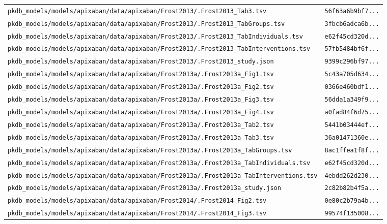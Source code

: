 \documentclass{article}
\begin{document}
\begin{longtable}{ll}
\texttt{pkdb\_models/models/apixaban/data/apixaban/Frost2013/.Frost2013\_Tab3.tsv} & \texttt{56f63a6b9bf7...} \\
\texttt{pkdb\_models/models/apixaban/data/apixaban/Frost2013/.Frost2013\_TabGroups.tsv} & \texttt{3fbcb6adca6b...} \\
\texttt{pkdb\_models/models/apixaban/data/apixaban/Frost2013/.Frost2013\_TabIndividuals.tsv} & \texttt{e62f45cd320d...} \\
\texttt{pkdb\_models/models/apixaban/data/apixaban/Frost2013/.Frost2013\_TabInterventions.tsv} & \texttt{57fb5484bf6f...} \\
\texttt{pkdb\_models/models/apixaban/data/apixaban/Frost2013/.Frost2013\_study.json} & \texttt{9399c296bf97...} \\
\texttt{pkdb\_models/models/apixaban/data/apixaban/Frost2013a/.Frost2013a\_Fig1.tsv} & \texttt{5c43a705d634...} \\
\texttt{pkdb\_models/models/apixaban/data/apixaban/Frost2013a/.Frost2013a\_Fig2.tsv} & \texttt{0366e460bdf1...} \\
\texttt{pkdb\_models/models/apixaban/data/apixaban/Frost2013a/.Frost2013a\_Fig3.tsv} & \texttt{56dda1a349f9...} \\
\texttt{pkdb\_models/models/apixaban/data/apixaban/Frost2013a/.Frost2013a\_Fig4.tsv} & \texttt{a0fad84f6d75...} \\
\texttt{pkdb\_models/models/apixaban/data/apixaban/Frost2013a/.Frost2013a\_Tab2.tsv} & \texttt{5441b03444ef...} \\
\texttt{pkdb\_models/models/apixaban/data/apixaban/Frost2013a/.Frost2013a\_Tab3.tsv} & \texttt{36a01471360e...} \\
\texttt{pkdb\_models/models/apixaban/data/apixaban/Frost2013a/.Frost2013a\_TabGroups.tsv} & \texttt{8ac1ffea1f8f...} \\
\texttt{pkdb\_models/models/apixaban/data/apixaban/Frost2013a/.Frost2013a\_TabIndividuals.tsv} & \texttt{e62f45cd320d...} \\
\texttt{pkdb\_models/models/apixaban/data/apixaban/Frost2013a/.Frost2013a\_TabInterventions.tsv} & \texttt{4ebdd262d230...} \\
\texttt{pkdb\_models/models/apixaban/data/apixaban/Frost2013a/.Frost2013a\_study.json} & \texttt{2c82b82b4f5a...} \\
\texttt{pkdb\_models/models/apixaban/data/apixaban/Frost2014/.Frost2014\_Fig2.tsv} & \texttt{0e80c2b79a4b...} \\
\texttt{pkdb\_models/models/apixaban/data/apixaban/Frost2014/.Frost2014\_Fig3.tsv} & \texttt{99574f135008...} \\

\end{longtable}
\end{document}
